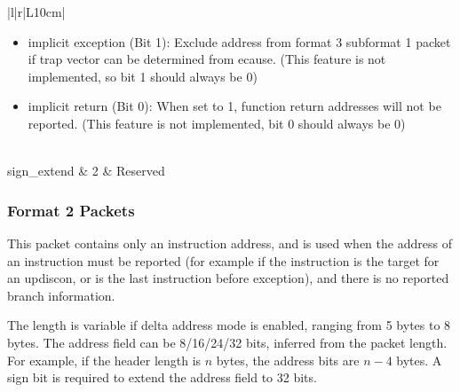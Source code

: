 \documentclass[main\_\_EN.tex]{subfiles}
\begin{document}
\begin{longtable}[c]{ |l|r|L{10cm}| }
\begin{itemize}
            \begin{itemize}
                \item 0: delta address mode
                \item 1: full address mode
            \end{itemize}
        \item implicit exception (Bit 1): Exclude address from format 3 subformat 1 packet if trap vector can be determined from ecause. (This feature is not implemented, so bit 1 should always be 0)
        \item implicit return (Bit 0): When set to 1, function return addresses will not be reported. (This feature is not implemented, bit 0 should always be 0)
    \end{itemize}
    \\\hline
    sign\_extend & 2 & Reserved \\\hline

 \end{longtable}



\subsubsection{Format 2 Packets}

This packet contains only an instruction address, and is used when the address of an instruction must be reported (for example if the instruction is the target for an updiscon, or is the last instruction before exception), and there is no reported branch information.


The length is variable if delta address mode is enabled, ranging from 5 bytes to 8 bytes. The address field can be 8/16/24/32 bits, inferred from the packet length. For example, if the header length is $n$ bytes, the address bits are $n-4$ bytes. A sign bit is required to extend the address field to 32 bits.
\end{document}
